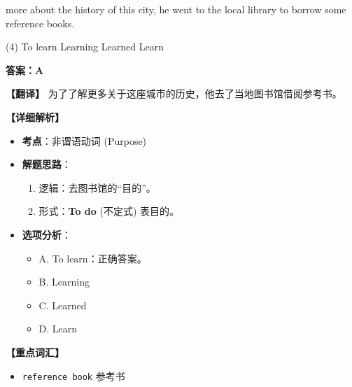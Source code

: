 \documentclass[11pt, a4paper]{article}
\newcommand{\analysis}[4]{
    \begin{solutionbox}
        \textbf{答案：#1}
        
        \textbf{【翻译】} #2
        
        \textbf{【详细解析】}
        #3
        
        \textbf{【重点词汇】}
        #4
    \end{solutionbox}
}
\newcommand{\blank}{\underline{\hspace{1.5cm}}}
\begin{document}
\begin{questions}
    \item \blank more about the history of this city, he went to the local library to borrow some reference books.
    \begin{tasks}(4)
        \task To learn \task Learning \task Learned \task Learn
    \end{tasks}
    \analysis{A}{为了了解更多关于这座城市的历史，他去了当地图书馆借阅参考书。}{
        \begin{itemize}
            \item \textbf{考点}：非谓语动词 (Purpose)
            \item \textbf{解题思路}：
                \begin{enumerate}
                    \item 逻辑：去图书馆的“目的”。
                    \item 形式：\textbf{To do} (不定式) 表目的。
                \end{enumerate}
            \item \textbf{选项分析}：
                \begin{itemize}
                    \item A. To learn：正确答案。
                    \item B. Learning
                    \item C. Learned
                    \item D. Learn
                \end{itemize}
        \end{itemize}
    }{
        \begin{itemize}
            \item \texttt{reference book} 参考书
        \end{itemize}
    }


\end{questions}
\end{document}
